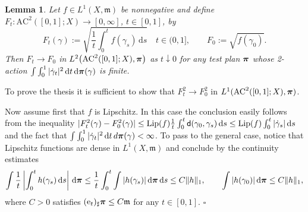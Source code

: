 \documentclass[reqno,11pt]{article}
\numberwithin{equation}{section}
\newcommand{\mm}{{\mbox{\boldmath$m$}}}
\newcommand{\ppi}{{\mbox{\boldmath$\pi$}}}
\newcommand{\sfd}{{\sf d}}
\newcommand{\Lip}{\mathop{\rm Lip}\nolimits}          %
\renewcommand{\d}{{\mathrm d}}
\newenvironment{proof}{\removelastskip\par\medskip   %
\noindent{\em Proof.}
\rm}{\penalty-20\null\hfill$\square$\par\medbreak}
\newtheorem{lemma}[theorem]{Lemma}
\newcommand{\e}{{\rm{e}}}                           %
\newcommand{\AC}[3]{\mathrm{AC}^{#1}(#2;#3)}
\renewcommand{\mm}{\mathfrak m}
\begin{document}
\begin{lemma}\label{le:convl2}
Let $f\in L^1(X,\mm)$ be nonnegative and define
$F_t:\AC2{[0,1]}X \to [0,\infty]$, $t\in [0,1]$, by
\[
F_t(\gamma):=\sqrt{\frac1t\int_0^tf(\gamma_s)\,\d s}\quad t\in
(0,1],\qquad F_0:= \sqrt{f(\gamma_0)}.
\]
Then $F_t\to F_0$ in $L^2\bigl(\AC2{[0,1]}X ,\ppi\bigr)$ as
$t\downarrow0$ for any test plan $\ppi$ whose 2-action
$\int\int_0^1|\dot\gamma_t|^2\,\d t\,\d\ppi(\gamma)$ is finite.
\end{lemma}
\begin{proof}
To prove the thesis it is sufficient to show that $F_t^2\to F^2_0$
in $L^1(\AC2{[0,1]}X ,\ppi)$.

Now assume first that $f$ is Lipschitz. In this case the conclusion
easily follows from the inequality
$|F_t^2(\gamma)-F_0^2(\gamma)|\leq \Lip(f) \tfrac
1t\int_0^t\sfd(\gamma_0,\gamma_s)\,\d s\leq
\Lip(f)\int_0^t|\dot\gamma_s|\,\d s$ and the fact that
$\int\int_0^1|\dot\gamma_t|^2\,\d t\,d\ppi(\gamma)<\infty$. To pass
to the general case, notice that Lipschitz functions are dense in
$L^1(X,\mm)$ and conclude by the continuity estimates
\[
\int\frac1t\left|\int_0^t h(\gamma_s)\,\d s\right|\,\d\ppi
\leq\frac1t\int_0^t\int|h(\gamma_s)|\,\d\ppi\,\d s\leq
C\|h\|_1,\qquad \int|h(\gamma_0)|\,\d\ppi\leq C\|h\|_1,
\]
where $C>0$ satisfies $(\e_t)_\sharp\ppi\leq C\mm$ for any
$t\in[0,1]$.
\end{proof}
\end{document}
